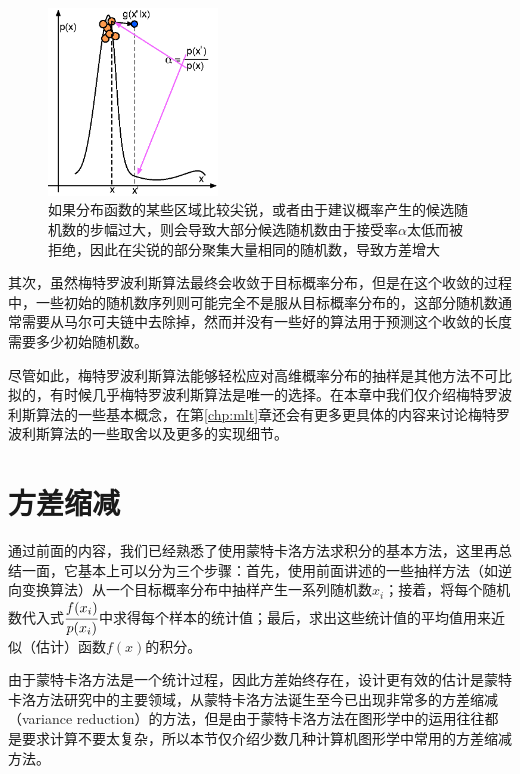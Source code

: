 \begin{figure}
	\sidecaption
	\includegraphics[width=0.4\textwidth]{figures/mc/metropolis-1}
	\caption{如果分布函数的某些区域比较尖锐，或者由于建议概率产生的候选随机数的步幅过大，则会导致大部分候选随机数由于接受率$\alpha$太低而被拒绝，因此在尖锐的部分聚集大量相同的随机数，导致方差增大}
	\label{f:mc-met-1}
\end{figure}

其次，虽然梅特罗波利斯算法最终会收敛于目标概率分布，但是在这个收敛的过程中，一些初始的随机数序列则可能完全不是服从目标概率分布的，这部分随机数通常需要从马尔可夫链中去除掉，然而并没有一些好的算法用于预测这个收敛的长度需要多少初始随机数。

尽管如此，梅特罗波利斯算法能够轻松应对高维概率分布的抽样是其他方法不可比拟的，有时候几乎梅特罗波利斯算法是唯一的选择。在本章中我们仅介绍梅特罗波利斯算法的一些基本概念，在第\ref{chp:mlt}章还会有更多更具体的内容来讨论梅特罗波利斯算法的一些取舍以及更多的实现细节。





\section{方差缩减}\label{sec:Variance-Reduction}
通过前面的内容，我们已经熟悉了使用蒙特卡洛方法求积分的基本方法，这里再总结一面，它基本上可以分为三个步骤：首先，使用前面讲述的一些抽样方法（如逆向变换算法）从一个目标概率分布中抽样产生一系列随机数$x_i$；接着，将每个随机数代入式$ \cfrac{f(x_i)}{p(x_i)}$中求得每个样本的统计值；最后，求出这些统计值的平均值用来近似（估计）函数$f(x)$的积分。

由于蒙特卡洛方法是一个统计过程，因此方差始终存在，设计更有效的估计是蒙特卡洛方法研究中的主要领域，从蒙特卡洛方法诞生至今已出现非常多的方差缩减（variance reduction）的方法，但是由于蒙特卡洛方法在图形学中的运用往往都是要求计算不要太复杂，所以本节仅介绍少数几种计算机图形学中常用的方差缩减方法。






